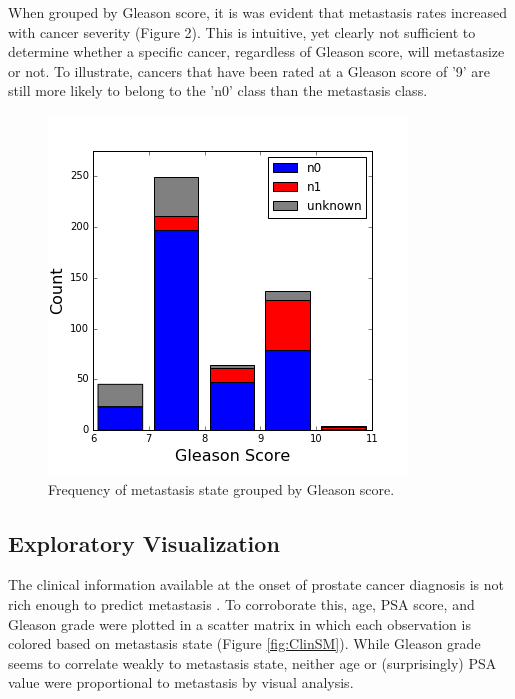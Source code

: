 \documentclass[final]{article}
\begin{document}
When grouped by Gleason score, it is was evident that metastasis rates increased
with cancer severity (Figure 2).  This is  intuitive, yet clearly
not sufficient to determine whether a specific cancer, regardless of Gleason
score, will metastasize or not.  To illustrate, cancers that have been rated at
a Gleason score of '9' are still more likely to belong to the 'n0' class than
the metastasis class.

\begin{figure}
  \centering
  \includegraphics[scale=0.5]{GleasonHist}
  \caption{Frequency of metastasis state grouped by Gleason score.\label{fig:preGSHist}}
\end{figure}

\subsection{Exploratory Visualization}

The clinical information available at the onset of prostate cancer diagnosis is
not rich enough to predict metastasis \cite{Brawley16}.  To corroborate this,
age, PSA score, and Gleason grade were plotted in a scatter matrix in which
each observation is colored based on metastasis state (Figure \ref{fig:ClinSM}).
While Gleason grade seems to correlate weakly to metastasis state, neither age or
(surprisingly) PSA value were proportional to metastasis by visual analysis.
\end{document}
